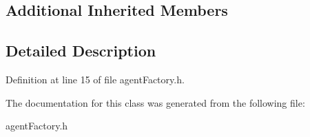 \subsection*{Additional Inherited Members}


\subsection{Detailed Description}


Definition at line 15 of file agent\+Factory.\+h.



The documentation for this class was generated from the following file\+:\begin{DoxyCompactItemize}
\item 
agent\+Factory.\+h\end{DoxyCompactItemize}
